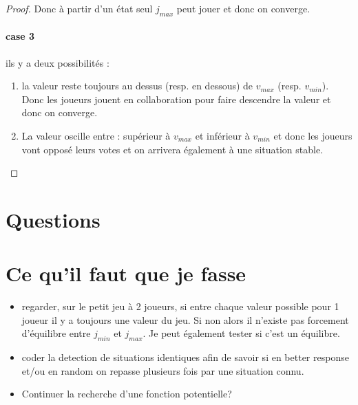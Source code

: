 \documentclass[12pt]{article}
\theoremstyle{defi}
\theoremstyle{not}
\theoremstyle{prob}
\begin{document}
\begin{proof}
        Donc à partir d'un état seul $j_{max}$ peut jouer et donc on converge.


        \paragraph{case 3}
          ils y a deux possibilités :

          \begin{enumerate}
            \item la valeur reste toujours au dessus (resp. en dessous) de $v_{max}$ (resp. $v_{min}$).
              Donc les joueurs jouent en collaboration pour faire descendre la valeur et donc on converge.

            \item La valeur oscille entre : supérieur à $v_{max}$ et inférieur à $v_{min}$ et donc les joueurs vont opposé leurs votes et on arrivera également à une situation stable.
          \end{enumerate}
      \end{proof}

  \section{Questions}
  \section{Ce qu'il faut que je fasse}

    \begin{itemize}
      \color{red}
      \item regarder, sur le petit jeu à 2 joueurs, si entre chaque valeur possible pour 1 joueur il y a toujours une valeur du jeu. Si non alors il n'existe pas forcement d'équilibre entre $j_{min}$ et $j_{max}$. Je peut également tester si c'est un équilibre.
      \item coder la detection de situations identiques afin de savoir si en better response et/ou en random on repasse plusieurs fois par une situation connu.
      \item Continuer la recherche d'une fonction potentielle?
    \end{itemize}
\end{document}
